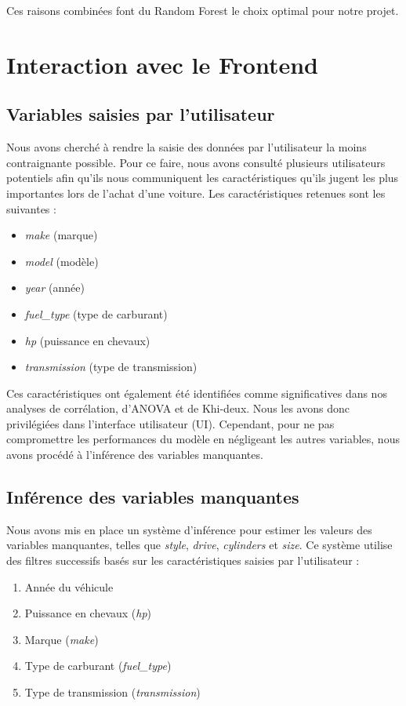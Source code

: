 \documentclass[12pt]{report}
\begin{document}
Ces raisons combinées font du Random Forest le choix optimal pour notre projet.



\section{Interaction avec le Frontend}

\subsection{Variables saisies par l'utilisateur}

Nous avons cherché à rendre la saisie des données par l'utilisateur la moins contraignante possible. Pour ce faire, nous avons consulté plusieurs utilisateurs potentiels afin qu'ils nous communiquent les caractéristiques qu'ils jugent les plus importantes lors de l'achat d'une voiture. Les caractéristiques retenues sont les suivantes :
\begin{itemize}
    \item \textit{make} (marque)
    \item \textit{model} (modèle)
    \item \textit{year} (année)
    \item \textit{fuel\_type} (type de carburant)
    \item \textit{hp} (puissance en chevaux)
    \item \textit{transmission} (type de transmission)
\end{itemize}

Ces caractéristiques ont également été identifiées comme significatives dans nos analyses de corrélation, d'ANOVA et de Khi-deux. Nous les avons donc privilégiées dans l'interface utilisateur (UI). Cependant, pour ne pas compromettre les performances du modèle en négligeant les autres variables, nous avons procédé à l'inférence des variables manquantes.

\subsection{Inférence des variables manquantes}

Nous avons mis en place un système d'inférence pour estimer les valeurs des variables manquantes, telles que \textit{style}, \textit{drive}, \textit{cylinders} et \textit{size}. Ce système utilise des filtres successifs basés sur les caractéristiques saisies par l'utilisateur :
\begin{enumerate}
    \item Année du véhicule
    \item Puissance en chevaux (\textit{hp})
    \item Marque (\textit{make})
    \item Type de carburant (\textit{fuel\_type})
    \item Type de transmission (\textit{transmission})
\end{enumerate}
\end{document}
